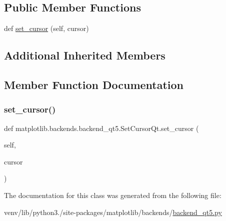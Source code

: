 \subsection*{Public Member Functions}
\begin{DoxyCompactItemize}
\item 
def \hyperlink{classmatplotlib_1_1backends_1_1backend__qt5_1_1SetCursorQt_a7946558827ed98770f887a0e3fdd66ac}{set\+\_\+cursor} (self, cursor)
\end{DoxyCompactItemize}
\subsection*{Additional Inherited Members}


\subsection{Member Function Documentation}
\mbox{\label{classmatplotlib_1_1backends_1_1backend__qt5_1_1SetCursorQt_a7946558827ed98770f887a0e3fdd66ac}} 
\subsubsection{\texorpdfstring{set\+\_\+cursor()}{set\_cursor()}}
{\footnotesize\ttfamily def matplotlib.\+backends.\+backend\+\_\+qt5.\+Set\+Cursor\+Qt.\+set\+\_\+cursor (\begin{DoxyParamCaption}\item[{}]{self,  }\item[{}]{cursor }\end{DoxyParamCaption})}



The documentation for this class was generated from the following file\+:\begin{DoxyCompactItemize}
\item 
venv/lib/python3./site-\/packages/matplotlib/backends/\hyperlink{backend__qt5_8py}{backend\+\_\+qt5.\+py}\end{DoxyCompactItemize}
